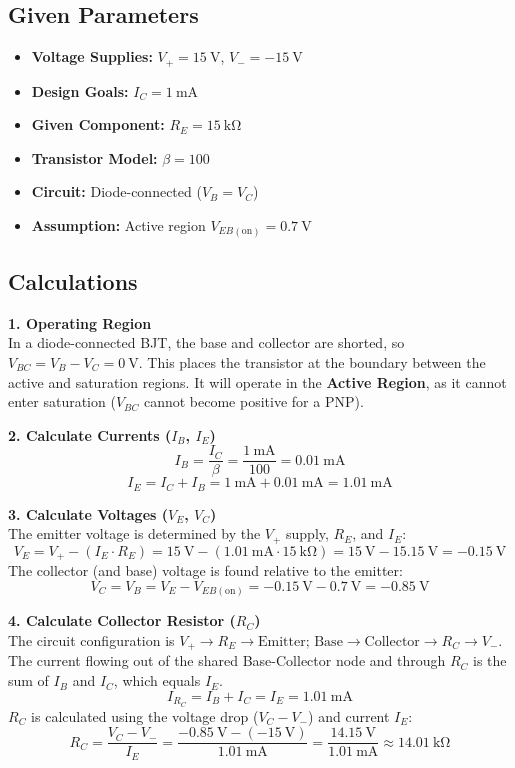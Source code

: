 \documentclass[11pt]{article}
\begin{document}
\subsection{Given Parameters}
\begin{itemize}
    \item \textbf{Voltage Supplies:} $V_{+} = \SI{15}{\volt}$, $V_{-} = \SI{-15}{\volt}$
    \item \textbf{Design Goals:} $I_{C} = \SI{1}{\milli\ampere}$
    \item \textbf{Given Component:} $R_E = \SI{15}{\kilo\ohm}$
    \item \textbf{Transistor Model:} $\beta = 100$
    \item \textbf{Circuit:} Diode-connected ($V_B = V_C$)
    \item \textbf{Assumption:} Active region $V_{EB(\text{on})} = \SI{0.7}{\volt}$
\end{itemize}

\subsection{Calculations}
\textbf{1. Operating Region} \\
In a diode-connected BJT, the base and collector are shorted, so $V_{BC} = V_B - V_C = \SI{0}{\volt}$. This places the transistor at the boundary between the active and saturation regions. It will operate in the \textbf{Active Region}, as it cannot enter saturation ($V_{BC}$ cannot become positive for a PNP).

\textbf{2. Calculate Currents ($I_B$, $I_E$)}
$$
I_B = \frac{I_C}{\beta} = \frac{\SI{1}{\milli\ampere}}{100} = \SI{0.01}{\milli\ampere}
$$
$$
I_E = I_C + I_B = \SI{1}{\milli\ampere} + \SI{0.01}{\milli\ampere} = \SI{1.01}{\milli\ampere}
$$

\textbf{3. Calculate Voltages ($V_E$, $V_C$)} \\
The emitter voltage is determined by the $V_+$ supply, $R_E$, and $I_E$:
$$
V_E = V_{+} - (I_E \cdot R_E) = \SI{15}{\volt} - (\SI{1.01}{\milli\ampere} \cdot \SI{15}{\kilo\ohm}) = \SI{15}{\volt} - \SI{15.15}{\volt} = \SI{-0.15}{\volt}
$$
The collector (and base) voltage is found relative to the emitter:
$$
V_C = V_B = V_E - V_{EB(\text{on})} = \SI{-0.15}{\volt} - \SI{0.7}{\volt} = \SI{-0.85}{\volt}
$$

\textbf{4. Calculate Collector Resistor ($R_C$)} \\
The circuit configuration is $V_+ \to R_E \to \text{Emitter; Base} \to \text{Collector} \to R_C \to V_-$.
The current flowing out of the shared Base-Collector node and through $R_C$ is the sum of $I_B$ and $I_C$, which equals $I_E$.
$$
I_{R_C} = I_B + I_C = I_E = \SI{1.01}{\milli\ampere}
$$
$R_C$ is calculated using the voltage drop ($V_C - V_-$) and current $I_E$:
$$
R_C = \frac{V_C - V_{-}}{I_E} = \frac{\SI{-0.85}{\volt} - (\SI{-15}{\volt})}{\SI{1.01}{\milli\ampere}} = \frac{\SI{14.15}{\volt}}{\SI{1.01}{\milli\ampere}} \approx \SI{14.01}{\kilo\ohm}
$$
\end{document}
